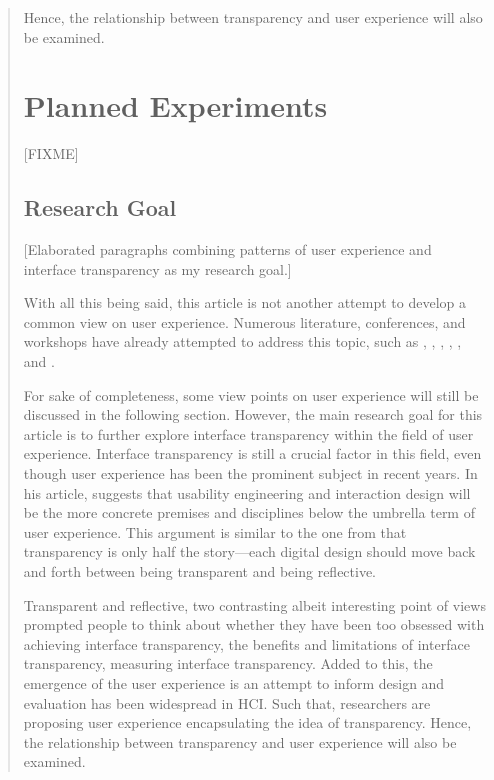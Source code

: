 \documentclass[a4paper,titlepage]{article}
\begin{document}
\begin{quote}
Hence, the relationship between transparency and user
experience will also be examined.


\section{Planned Experiments}
\label{sec:experiment}
[FIXME]

\subsection{Research Goal}
[Elaborated paragraphs combining patterns of user experience and
  interface transparency as my research goal.]

With all this being said, this article is not another attempt to
develop a common view on user experience. Numerous literature,
conferences, and workshops have already attempted to address this
topic, such as \citet{early:forlizzi}, \citet{emotional:norman},
\citet{action:dourish}, \citet{ux:hassenzahl},
\citet{experience:desmet}, and \citet{ux:law}.

For sake of completeness, some view points on user experience will
still be discussed in the following section. However, the main
research goal for this article is to further explore interface
transparency within the field of user experience. Interface
transparency is still a crucial factor in this field, even though user
experience has been the prominent subject in recent years. In his
article, \citet{future:memmel} suggests that usability engineering and
interaction design will be the more concrete premises and disciplines
below the umbrella term of user experience. This argument is similar
to the one from \citet{windows:bolter} that transparency is only half
the story---each digital design should move back and forth between
being transparent and being reflective.

Transparent and reflective, two contrasting albeit interesting point
of views prompted people to think about whether they have been too
obsessed with achieving interface transparency, the benefits and
limitations of interface transparency, measuring interface
transparency. Added to this, the emergence of the user experience is
an attempt to inform design and evaluation has been widespread in
HCI. Such that, researchers are proposing user experience
encapsulating the idea of transparency. Hence, the relationship
between transparency and user experience will also be examined.


\end{quote}
\end{document}
